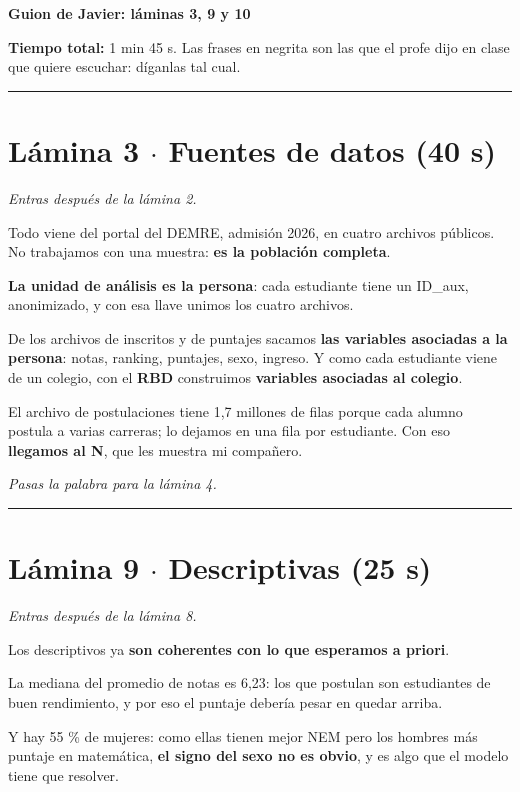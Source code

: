 \documentclass[11pt]{article}
\begin{document}
{\LARGE\bfseries Guion de Javier: láminas 3, 9 y 10\par}\medskip

\textbf{Tiempo total:} 1 min 45 s. Las frases en negrita son las que el profe dijo en clase que quiere escuchar: díganlas tal cual.\par

\medskip\hrule\medskip

\section*{Lámina 3 $\cdot$ Fuentes de datos (40 s)}

\textit{Entras después de la lámina 2.}\par

\begin{guion}Todo viene del portal del DEMRE, admisión 2026, en cuatro archivos públicos. No trabajamos con una muestra: \textbf{es la población completa}.\par \textbf{La unidad de análisis es la persona}: cada estudiante tiene un ID\_aux, anonimizado, y con esa llave unimos los cuatro archivos.\par De los archivos de inscritos y de puntajes sacamos \textbf{las variables asociadas a la persona}: notas, ranking, puntajes, sexo, ingreso. Y como cada estudiante viene de un colegio, con el \textbf{RBD} construimos \textbf{variables asociadas al colegio}.\par El archivo de postulaciones tiene 1,7 millones de filas porque cada alumno postula a varias carreras; lo dejamos en una fila por estudiante. Con eso \textbf{llegamos al N}, que les muestra mi compañero.\end{guion}

\textit{Pasas la palabra para la lámina 4.}\par

\medskip\hrule\medskip

\section*{Lámina 9 $\cdot$ Descriptivas (25 s)}

\textit{Entras después de la lámina 8.}\par

\begin{guion}Los descriptivos ya \textbf{son coherentes con lo que esperamos a priori}.\par La mediana del promedio de notas es 6,23: los que postulan son estudiantes de buen rendimiento, y por eso el puntaje debería pesar en quedar arriba.\par Y hay 55 \% de mujeres: como ellas tienen mejor NEM pero los hombres más puntaje en matemática, \textbf{el signo del sexo no es obvio}, y es algo que el modelo tiene que resolver.\end{guion}
\end{document}
